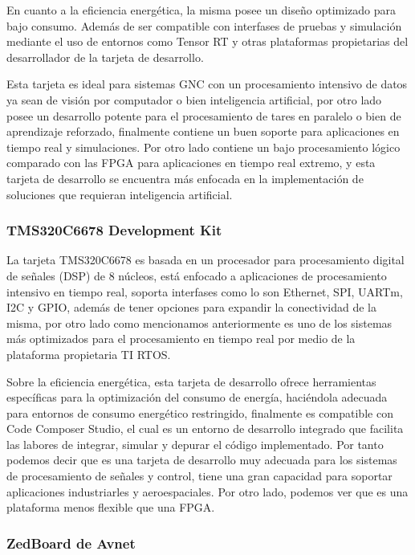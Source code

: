 En cuanto a la eficiencia energética, la misma posee un diseño optimizado para bajo consumo. Además de ser compatible con interfases de pruebas y simulación mediante el uso de entornos como Tensor RT y otras plataformas propietarias del desarrollador de la tarjeta de desarrollo.

Esta tarjeta es ideal para sistemas GNC con un procesamiento intensivo de datos ya sean de visión por computador o bien inteligencia artificial, por otro lado posee un desarrollo potente para el procesamiento de tares en paralelo o bien de aprendizaje reforzado, finalmente contiene un buen soporte para aplicaciones en tiempo real y simulaciones. Por otro lado contiene un bajo procesamiento lógico comparado con las FPGA para aplicaciones en tiempo real extremo, y esta tarjeta de desarrollo se encuentra más enfocada en la implementación de soluciones que requieran inteligencia artificial.

\subsubsection{TMS320C6678 Development Kit}

La tarjeta TMS320C6678 es basada en un procesador para procesamiento digital de señales (DSP) de 8 núcleos, está enfocado a aplicaciones de procesamiento intensivo en tiempo real, soporta
interfases como lo son Ethernet, SPI, UARTm, I2C y GPIO, además de tener opciones para expandir la conectividad de la misma, por otro lado como mencionamos anteriormente es uno de los sistemas
más optimizados para el procesamiento en tiempo real por medio de la plataforma propietaria TI RTOS.

Sobre la eficiencia energética, esta tarjeta de desarrollo ofrece herramientas específicas para la optimización del consumo de energía, haciéndola adecuada para entornos de consumo energético 
restringido, finalmente es compatible con Code Composer Studio, el cual es un entorno de desarrollo integrado que facilita las labores de integrar, simular y depurar el código implementado. Por tanto podemos decir que es una tarjeta de desarrollo muy adecuada para los sistemas de procesamiento de señales y control, tiene una gran capacidad para soportar aplicaciones industriarles y aeroespaciales. Por otro lado, podemos ver que es una plataforma menos flexible que una FPGA. 

\subsubsection{ZedBoard de Avnet}

